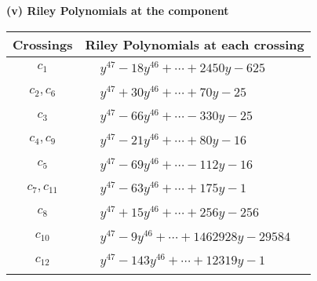 \documentclass[1p]{elsarticle_modified}
\theoremstyle{definition}
\begin{document}
\newpage\renewcommand{\arraystretch}{1}
\flushleft \textbf{(v) Riley Polynomials at the component}\newline \\
\begin{tabular}{m{50pt}|m{274pt}}
Crossings & \hspace{64pt}Riley Polynomials at each crossing \\
\hline $$\begin{aligned}c_{1}\end{aligned}$$&$\begin{aligned}
&y^{47}-18 y^{46}+\cdots+2450 y-625
\end{aligned}$\\
\hline $$\begin{aligned}c_{2},c_{6}\end{aligned}$$&$\begin{aligned}
&y^{47}+30 y^{46}+\cdots+70 y-25
\end{aligned}$\\
\hline $$\begin{aligned}c_{3}\end{aligned}$$&$\begin{aligned}
&y^{47}-66 y^{46}+\cdots-330 y-25
\end{aligned}$\\
\hline $$\begin{aligned}c_{4},c_{9}\end{aligned}$$&$\begin{aligned}
&y^{47}-21 y^{46}+\cdots+80 y-16
\end{aligned}$\\
\hline $$\begin{aligned}c_{5}\end{aligned}$$&$\begin{aligned}
&y^{47}-69 y^{46}+\cdots-112 y-16
\end{aligned}$\\
\hline $$\begin{aligned}c_{7},c_{11}\end{aligned}$$&$\begin{aligned}
&y^{47}-63 y^{46}+\cdots+175 y-1
\end{aligned}$\\
\hline $$\begin{aligned}c_{8}\end{aligned}$$&$\begin{aligned}
&y^{47}+15 y^{46}+\cdots+256 y-256
\end{aligned}$\\
\hline $$\begin{aligned}c_{10}\end{aligned}$$&$\begin{aligned}
&y^{47}-9 y^{46}+\cdots+1462928 y-29584
\end{aligned}$\\
\hline $$\begin{aligned}c_{12}\end{aligned}$$&$\begin{aligned}
&y^{47}-143 y^{46}+\cdots+12319 y-1
\end{aligned}$\\
\hline
\end{tabular}\\~\\
\end{document}
